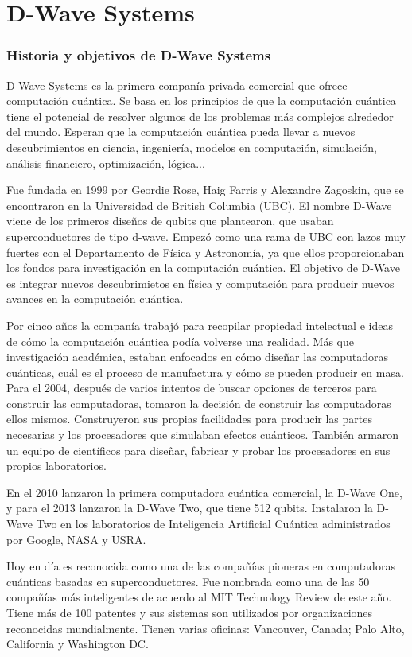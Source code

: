 \documentclass[11pt,a4paper]{article}
\begin{document}
\part{D-Wave Systems}
\section*{Historia y objetivos de D-Wave Systems}

D-Wave Systems es la primera companía privada comercial que ofrece computación cuántica. Se basa en los principios de que la computación cuántica tiene el potencial de resolver algunos de los problemas más complejos alrededor del mundo. Esperan que la computación cuántica pueda llevar a nuevos descubrimientos en ciencia, ingeniería, modelos en computación, simulación, análisis financiero, optimización, lógica...

Fue fundada en 1999 por Geordie Rose, Haig Farris y Alexandre Zagoskin, que se encontraron en la Universidad de British Columbia (UBC). El nombre D-Wave viene de los primeros diseños de qubits que plantearon, que usaban superconductores de tipo d-wave. Empezó como una rama de UBC con lazos muy fuertes con el Departamento de Física y Astronomía, ya que ellos proporcionaban los fondos para investigación en la computación cuántica. El objetivo de D-Wave es integrar nuevos descubrimietos en física y computación para producir nuevos avances en la computación cuántica.

Por cinco años la companía trabajó para recopilar propiedad intelectual e ideas de cómo la computación cuántica podía volverse una realidad. Más que investigación académica, estaban enfocados en cómo diseñar las computadoras cuánticas, cuál es el proceso de manufactura y cómo se pueden producir en masa. 
Para el 2004, después de varios intentos de buscar opciones de terceros para construir las computadoras, tomaron la decisión de construir las computadoras ellos mismos. Construyeron sus propias facilidades para producir las partes necesarias y los procesadores que simulaban efectos cuánticos. También armaron un equipo de científicos para diseñar, fabricar y probar los procesadores en sus propios laboratorios. 

En el 2010 lanzaron la primera computadora cuántica comercial, la D-Wave One, y para el 2013 lanzaron la D-Wave Two, que tiene 512 qubits. Instalaron la D-Wave Two en los laboratorios de Inteligencia Artificial Cuántica administrados por Google, NASA y USRA. 

Hoy en día es reconocida como una de las compañías pioneras en computadoras cuánticas basadas en superconductores. Fue nombrada como una de las 50 compañías más inteligentes de acuerdo al MIT Technology Review de este año. Tiene más de 100 patentes y sus sistemas son utilizados por organizaciones reconocidas mundialmente. Tienen varias oficinas: Vancouver, Canada; Palo Alto, California y Washington DC. 
\end{document}
